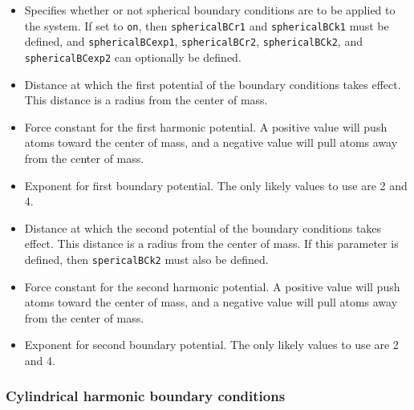 \begin{itemize}

\item
{}
{Specifies whether or not spherical boundary conditions 
are to be applied to the system.  If 
set to {\tt on}, then {\tt sphericalBCr1} and {\tt sphericalBCk1} 
must be defined, and {\tt sphericalBCexp1}, {\tt sphericalBCr2}, 
{\tt sphericalBCk2}, and {\tt sphericalBCexp2} can optionally be 
defined.}

\item
{}
{Distance at which the first potential of the boundary conditions takes
effect.  This distance is a radius from the center of mass.}

\item
{}
{Force constant for the first harmonic potential.  A positive
value will push atoms toward the center of mass, and a negative
value will pull atoms away from the center of mass.}

\item
{}
{Exponent for first boundary potential.  The only likely values to
use are 2 and 4.}

\item
{}
{Distance at which the second potential of the boundary conditions takes
effect.  This distance is a radius from the center of mass.
If this parameter is defined, then {\tt spericalBCk2} must also
be defined.}

\item
{}
{Force constant for the second harmonic potential.  A positive
value will push atoms toward the center of mass, and a negative
value will pull atoms away from the center of mass.}

\item
{}
{Exponent for second boundary potential.  The only likely values to
use are 2 and 4.}

\end{itemize}

\subsubsection{Cylindrical harmonic boundary conditions}

